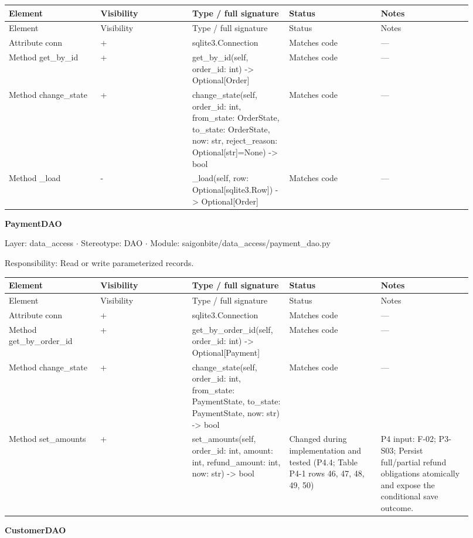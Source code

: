\begin{longtable}{>{\raggedright\arraybackslash}p{0.1840\linewidth}>{\raggedright\arraybackslash}p{0.1840\linewidth}>{\raggedright\arraybackslash}p{0.1840\linewidth}>{\raggedright\arraybackslash}p{0.1840\linewidth}>{\raggedright\arraybackslash}p{0.1840\linewidth}}
Element & Visibility & Type / full signature & Status & Notes \\
\hline\endfirsthead
Element & Visibility & Type / full signature & Status & Notes \\
\hline\endhead
Attribute conn & + & sqlite3.Connection & Matches code & --- \\
Method get\_by\_id & + & get\_by\_id(self, order\_id: int) -\textgreater{} Optional[Order] & Matches code & --- \\
Method change\_state & + & change\_state(self, order\_id: int, from\_state: OrderState, to\_state: OrderState, now: str, reject\_reason: Optional[str]=None) -\textgreater{} bool & Matches code & --- \\
Method \_load & - & \_load(self, row: Optional[sqlite3.Row]) -\textgreater{} Optional[Order] & Matches code & --- \\
\end{longtable}
\textbf{PaymentDAO}

Layer: data\_access \ensuremath{\cdot} Stereotype: \guillemotleft{}DAO\guillemotright{} \ensuremath{\cdot} Module: saigonbite/data\_access/payment\_dao.py

Responsibility: Read or write parameterized records.

\begin{longtable}{>{\raggedright\arraybackslash}p{0.1840\linewidth}>{\raggedright\arraybackslash}p{0.1840\linewidth}>{\raggedright\arraybackslash}p{0.1840\linewidth}>{\raggedright\arraybackslash}p{0.1840\linewidth}>{\raggedright\arraybackslash}p{0.1840\linewidth}}
Element & Visibility & Type / full signature & Status & Notes \\
\hline\endfirsthead
Element & Visibility & Type / full signature & Status & Notes \\
\hline\endhead
Attribute conn & + & sqlite3.Connection & Matches code & --- \\
Method get\_by\_order\_id & + & get\_by\_order\_id(self, order\_id: int) -\textgreater{} Optional[Payment] & Matches code & --- \\
Method change\_state & + & change\_state(self, order\_id: int, from\_state: PaymentState, to\_state: PaymentState, now: str) -\textgreater{} bool & Matches code & --- \\
Method set\_amounts & + & set\_amounts(self, order\_id: int, amount: int, refund\_amount: int, now: str) -\textgreater{} bool & Changed during implementation and tested (P4.4; Table P4-1 rows 46, 47, 48, 49, 50) & P4 input: F-02; P3-S03; Persist full/partial refund obligations atomically and expose the conditional save outcome. \\
\end{longtable}
\textbf{CustomerDAO}

